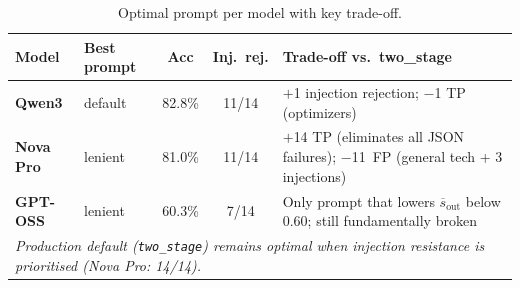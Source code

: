 \begin{table}[ht]
\centering
\caption{Optimal prompt per model with key trade-off.}
\label{tab:dj-prompt-recommendation}
\begin{tabular}{llccp{5cm}}
\toprule
Model & Best prompt & Acc & Inj.\ rej. & Trade-off vs.\ two\_stage \\
\midrule
\textbf{Qwen3}   & default    & 82.8\% & 11/14 & $+$1 injection rejection; $-$1 TP (optimizers) \\
\textbf{Nova Pro} & lenient    & 81.0\% & 11/14 & $+$14 TP (eliminates all JSON failures); $-$11~FP (general tech + 3 injections) \\
\textbf{GPT-OSS}  & lenient    & 60.3\% & 7/14  & Only prompt that lowers $\overline{s}_\mathrm{out}$ below 0.60; still fundamentally broken \\
\midrule
\multicolumn{5}{l}{\textit{Production default (\texttt{two\_stage}) remains optimal when injection resistance is prioritised (Nova Pro: 14/14).}} \\
\bottomrule
\end{tabular}
\end{table}
